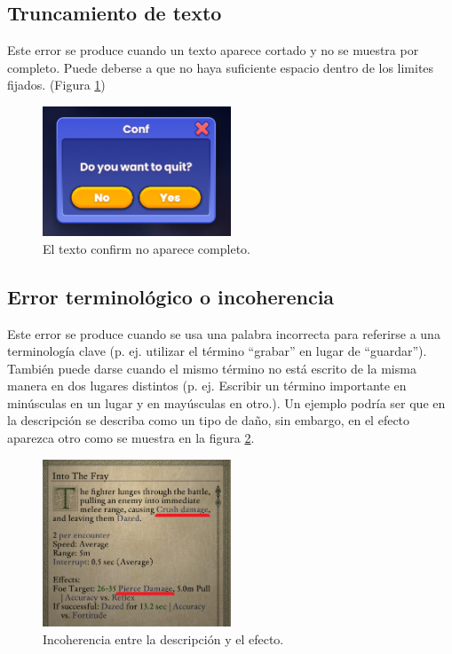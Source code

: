 \subsection{Truncamiento de texto}\label{ErrorTruncamiento}
Este error se produce cuando un texto aparece cortado y no se muestra por completo. Puede deberse a que no haya suficiente espacio dentro de los limites fijados.
(Figura \ref{fig:E_Trunc})
\begin{figure}[H]
	\centering
	\includegraphics[width = 0.5\textwidth]{Imagenes/Errores_Localizacion/E_Trunca.png}
	\caption{El texto confirm no aparece completo.}
	\label{fig:E_Trunc}
\end{figure}

\subsection{Error terminológico o incoherencia}\label{ErrorTermino}
Este error se produce cuando se usa una palabra incorrecta para referirse a una
terminología clave (p. ej. utilizar el término ``grabar'' en lugar de ``guardar''). También
puede darse cuando el mismo término no está escrito de la misma manera en dos
lugares distintos (p. ej. Escribir un término importante en minúsculas en un lugar
y en mayúsculas en otro.).
Un ejemplo podría ser que en la descripción se describa como un tipo de daño, sin embargo, en el efecto aparezca otro como se muestra en la figura \ref{fig:EIncoherencia}.
\begin{figure}[H]
	\centering
	\includegraphics[width = 0.5\textwidth]{Imagenes/Errores_Localizacion/E_Incoherencia.png}
	\caption{Incoherencia entre la descripción y el efecto.}
	\label{fig:EIncoherencia}
\end{figure}

